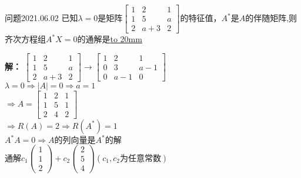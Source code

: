 \begin{mybox}{问题2021.06.02}
	\qquad 已知$\lambda=0$是矩阵$\begin{bmatrix}
	1 & 2 & 1 \\ 
	1 & 5 & a \\ 
	2 & a+3 & 2
	\end{bmatrix} $的特征值，$A^{*}$是$A$的伴随矩阵,则齐次方程组$A^{*}X=0$的通解是\underline{\hbox to 20mm{}}
\end{mybox}	
\noindent
\textbf{解：}
$\begin{bmatrix}
	1 & 2 & 1 \\ 
	1 & 5 & a \\ 
	2 & a+3 & 2
	\end{bmatrix} \longrightarrow \begin{bmatrix}
	1 & 2 & 1 \\ 
	0 & 3 & a-1 \\ 
	0 & a-1 & 0
	\end{bmatrix}$	\\
	\noindent
	$\lambda=0 \Rightarrow |A|=0 \Rightarrow a=1$\\
	$\Rightarrow A=\begin{bmatrix}
	1 & 2 & 1 \\ 
	1 & 5 & 1 \\ 
	2 & 4 & 2
	\end{bmatrix}$\\
	\noindent
	$\Rightarrow R(A)=2\Rightarrow R(A^{*})=1$\\
		$A^{*}A=0\Rightarrow A\text{的列向量是}A^{*}\text{的解}$\\
		$\text{通解} c_{1}\begin{pmatrix}
		1 \\ 
		1 \\ 
		2
		\end{pmatrix} +c_{2}\begin{pmatrix}
		2 \\ 
		5 \\ 
		4
		\end{pmatrix} (c_{1},c_{2}\text{为任意常数})$